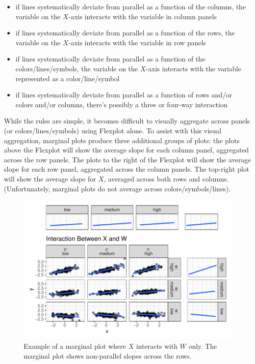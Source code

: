 \documentclass[
  man,floatsintext]{apa6}
\providecommand{\tightlist}{%
  \setlength{\itemsep}{0pt}\setlength{\parskip}{0pt}}
\begin{document}
\begin{itemize}
\tightlist
\item
  if lines systematically deviate from parallel as a function of the columns, the variable on the \(X\)-axis interacts with the variable in column panels
\item
  if lines systematically deviate from parallel as a function of the rows, the variable on the \(X\)-axis interacts with the variable in row panels
\item
  if lines systematically deviate from parallel as a function of the colors/lines/symbols, the variable on the \(X\)-axis interacts with the variable represented as a color/line/symbol
\item
  if lines systematically deviate from parallel as a function of rows and/or colors and/or columns, there's possibly a three or four-way interaction
\end{itemize}

While the rules are simple, it becomes difficult to visually aggregate across panels (or colors/lines/symbols) using Flexplot alone. To assist with this visual aggregation, marginal plots produce three additional groups of plots: the plots above the Flexplot will show the average slope for each column panel, aggregated across the row panels. The plots to the right of the Flexplot will show the average slope for each row panel, aggregated across the column panels. The top-right plot will show the average slope for \(X\), averaged across both rows and columns. (Unfortunately, marginal plots do not average across colors/symbols/lines).

\begin{figure}

{\centering \includegraphics[width=0.75\linewidth]{visual_partitions_files/figure-latex/threeinteractions2-1} 

}

\caption{Example of a marginal plot where $X$ interacts with $W$ only. The marginal plot shows non-parallel slopes across the rows.}\label{fig:threeinteractions2}
\end{figure}
\end{document}
